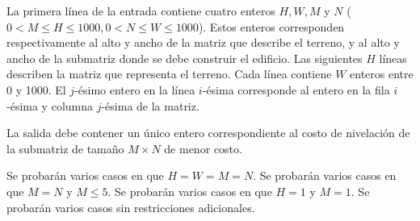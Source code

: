 \documentclass{oci}
\begin{document}
\begin{inputDescription}
  La primera línea de la entrada contiene cuatro enteros $H, W, M$ y $N$
  ($0 < M \leq H\leq 1000, 0 < N \leq W \leq 1000$).
  Estos enteros corresponden respectivamente al alto y ancho de la matriz que describe el terreno,
  y al alto y ancho de la submatriz donde se debe construir el edificio.
  Las siguientes $H$ líneas describen la matriz que representa el terreno.
  Cada línea contiene $W$ enteros entre 0 y 1000.
  El $j$-ésimo entero en la línea $i$-ésima corresponde al entero en la fila $i$-ésima y
  columna $j$-ésima de la matriz.
\end{inputDescription}

\begin{outputDescription}
  La salida debe contener un único entero correspondiente al costo de nivelación de la submatriz
  de tamaño $M\times N$ de menor costo.
\end{outputDescription}


\begin{scoreDescription}
  Se probarán varios casos en que $H=W=M=N$.
  Se probarán varios casos en que $M=N$ y $M\leq 5$.
  Se probarán varios casos en que $H=1$ y $M=1$.
  Se probarán varios casos sin restricciones adicionales.
\end{scoreDescription}

\begin{sampleDescription}
\end{sampleDescription}
\end{document}
